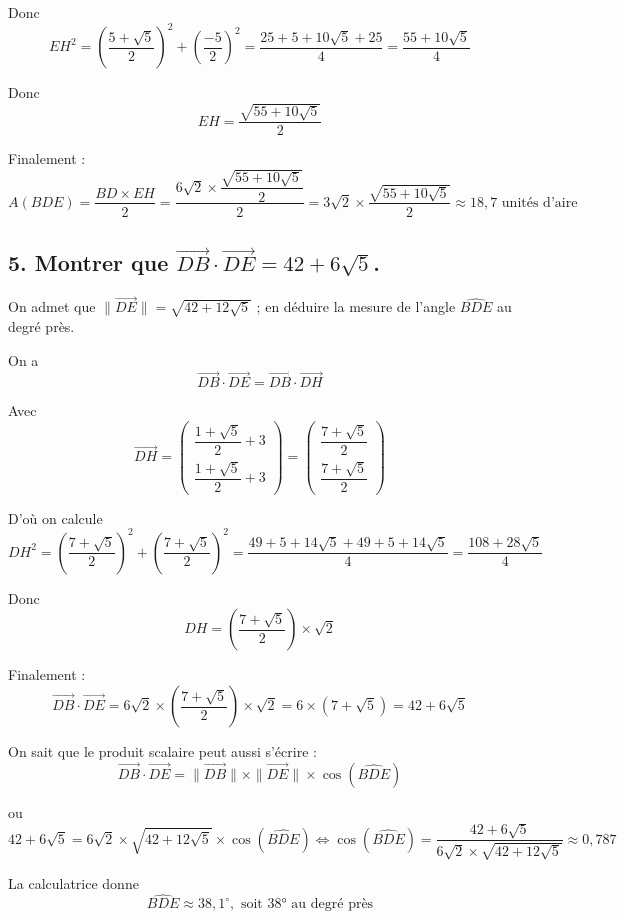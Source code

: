 	Donc
	\[
	EH^2 = \left( \dfrac{5 + \sqrt{5}}{2} \right)^2 + \left( \dfrac{-5}{2} \right)^2 = \dfrac{25 + 5 + 10\sqrt{5} + 25}{4} = \dfrac{55 + 10\sqrt{5}}{4}
	\]
	
	Donc
	\[
	EH = \dfrac{\sqrt{55 + 10\sqrt{5}}}{2}
	\]
	
	Finalement :
	\[
	A(BDE) = \dfrac{BD \times EH}{2} = \dfrac{6\sqrt{2} \times \dfrac{\sqrt{55 + 10\sqrt{5}}}{2}}{2} = 3\sqrt{2} \times \dfrac{\sqrt{55 + 10\sqrt{5}}}{2} \approx 18,7 \text{ unités d’aire}
	\]
	
	\subsection*{5. Montrer que $\overrightarrow{DB} \cdot \overrightarrow{DE} = 42 + 6\sqrt{5}$.}
	
	On admet que $\|\overrightarrow{DE}\| = \sqrt{42 + 12\sqrt{5}}$ ; en déduire la mesure de l’angle $\widehat{BDE}$ au degré près.
	
	On a
	\[
	\overrightarrow{DB} \cdot \overrightarrow{DE} = \overrightarrow{DB} \cdot \overrightarrow{DH}
	\]
	
	Avec
	\[
	\overrightarrow{DH} = \begin{pmatrix}
		\dfrac{1 + \sqrt{5}}{2} + 3 \\
		\dfrac{1 + \sqrt{5}}{2} + 3
	\end{pmatrix} = \begin{pmatrix}
		\dfrac{7 + \sqrt{5}}{2} \\
		\dfrac{7 + \sqrt{5}}{2}
	\end{pmatrix}
	\]
	
	D'où on calcule
	\[
	DH^2 = \left( \dfrac{7 + \sqrt{5}}{2} \right)^2 + \left( \dfrac{7 + \sqrt{5}}{2} \right)^2 = \dfrac{49 + 5 + 14\sqrt{5} + 49 + 5 + 14\sqrt{5}}{4} = \dfrac{108 + 28\sqrt{5}}{4}
	\]
	
	Donc
	\[
	DH = \left( \dfrac{7 + \sqrt{5}}{2} \right) \times \sqrt{2}
	\]
	
	Finalement :
	\[
	\overrightarrow{DB} \cdot \overrightarrow{DE} = 6\sqrt{2} \times \left( \dfrac{7 + \sqrt{5}}{2} \right) \times \sqrt{2} = 6 \times (7 + \sqrt{5}) = 42 + 6\sqrt{5}
	\]
	
	On sait que le produit scalaire peut aussi s’écrire :
	\[
	\overrightarrow{DB} \cdot \overrightarrow{DE} = \|\overrightarrow{DB}\| \times \|\overrightarrow{DE}\| \times \cos(\widehat{BDE})
	\]
	
	ou
	\[
	42 + 6\sqrt{5} = 6\sqrt{2} \times \sqrt{42 + 12\sqrt{5}} \times \cos(\widehat{BDE}) \iff \cos(\widehat{BDE}) = \dfrac{42 + 6\sqrt{5}}{6\sqrt{2} \times \sqrt{42 + 12\sqrt{5}}} \approx 0,787
	\]
	
	La calculatrice donne
	\[
	\widehat{BDE} \approx 38,1^\circ, \text{ soit 38° au degré près}
	\]

